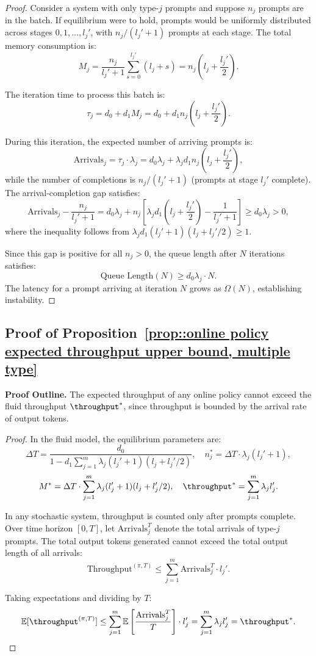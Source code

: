 \begin{proof}
Consider a system with only type-$j$ prompts and suppose $n_j$ prompts are in the batch. If equilibrium were to hold, prompts would be uniformly distributed across stages $0, 1, \ldots, l_j'$, with $n_j/(l_j'+1)$ prompts at each stage. The total memory consumption is:
$$M_j = \frac{n_j}{l_j'+1}\sum_{s=0}^{l_j'}(l_j + s) = n_j \left(l_j + \frac{l_j'}{2}\right).$$

The iteration time to process this batch is:
$$\tau_j = d_0 + d_1 M_j = d_0 + d_1 n_j \left(l_j + \frac{l_j'}{2}\right).$$

During this iteration, the expected number of arriving prompts is:
$$\text{Arrivals}_j = \tau_j \cdot \lambda_j = d_0\lambda_j + \lambda_j d_1 n_j \left(l_j + \frac{l_j'}{2}\right),$$
while the number of completions is $n_j/(l_j'+1)$ (prompts at stage $l_j'$ complete). The arrival-completion gap satisfies:
$$\text{Arrivals}_j - \frac{n_j}{l_j'+1} = d_0\lambda_j + n_j\left[\lambda_j d_1 \left(l_j + \frac{l_j'}{2}\right) - \frac{1}{l_j'+1}\right] \geq d_0\lambda_j > 0,$$
where the inequality follows from $\lambda_j d_1 (l_j'+1)(l_j + l_j'/2) \geq 1$.

Since this gap is positive for all $n_j > 0$, the queue length after $N$ iterations satisfies:
$$\text{Queue Length}(N) \geq d_0\lambda_j \cdot N.$$
The latency for a prompt arriving at iteration $N$ grows as $\Omega(N)$, establishing instability.
\end{proof}

\subsection{Proof of Proposition~\ref{prop::online policy expected throughput upper bound, multiple type}}
\label{appendix:proof_throughput_upper_bound}

\noindent\textbf{Proof Outline.} The expected throughput of any online policy cannot exceed the fluid throughput $\throughput^*$, since throughput is bounded by the arrival rate of output tokens.

\begin{proof}
In the fluid model, the equilibrium parameters are:
$$\Delta T = \frac{d_0}{1 - d_1\sum_{j=1}^m \lambda_j(l_j'+1)(l_j + l_j'/2)}, \quad n_j^* = \Delta T \cdot \lambda_j(l_j'+1),$$
$$M^* = \Delta T \cdot \sum_{j=1}^m \lambda_j(l_j'+1)(l_j + l_j'/2), \quad \throughput^* = \sum_{j=1}^m \lambda_j l_j'.$$

In any stochastic system, throughput is counted only after prompts complete. Over time horizon $[0,T]$, let $\text{Arrivals}_j^T$ denote the total arrivals of type-$j$ prompts. The total output tokens generated cannot exceed the total output length of all arrivals:
$$\text{Throughput}^{(\pi,T)} \leq \sum_{j=1}^m \text{Arrivals}_j^T \cdot l_j'.$$

Taking expectations and dividing by $T$:
$$\mathbb{E}[\throughput^{(\pi,T)}] \leq \sum_{j=1}^m \mathbb{E}\left[\frac{\text{Arrivals}_j^T}{T}\right] \cdot l_j' = \sum_{j=1}^m \lambda_j l_j' = \throughput^*.$$
\end{proof}


